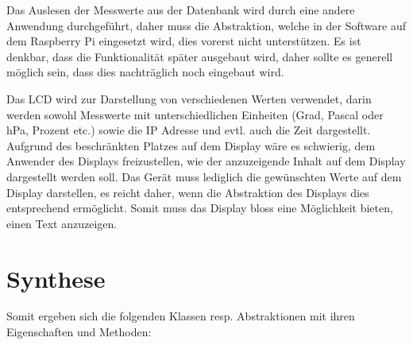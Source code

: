 \documentclass[
    10pt,
    a4paper,
]{scrartcl}
\begin{document}
Das Auslesen der Messwerte aus der Datenbank wird durch eine andere Anwendung
durchgeführt, daher muss die Abstraktion, welche in der Software auf dem Raspberry Pi
eingesetzt wird, dies vorerst nicht unterstützen. Es ist denkbar, dass die Funktionalität
später ausgebaut wird, daher sollte es generell möglich sein, dass dies nachträglich noch
eingebaut wird.

Das LCD wird zur Darstellung von verschiedenen Werten verwendet, darin werden sowohl
Messwerte mit unterschiedlichen Einheiten (Grad, Pascal oder hPa, Prozent etc.) sowie die
IP Adresse und evtl. auch die Zeit dargestellt. Aufgrund des beschränkten Platzes auf dem
Display wäre es schwierig, dem Anwender des Displays freizustellen, wie der anzuzeigende
Inhalt auf dem Display dargestellt werden soll. Das Gerät muss lediglich die gewünschten
Werte auf dem Display darstellen, es reicht daher, wenn die Abstraktion des Displays dies
entsprechend ermöglicht. Somit muss das Display bloss eine Möglichkeit bieten, einen Text
anzuzeigen.

\section{Synthese}

Somit ergeben sich die folgenden Klassen resp. Abstraktionen mit ihren Eigenschaften und
Methoden:
\end{document}
